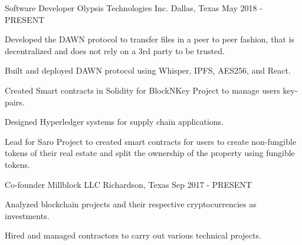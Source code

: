 

\begin{cventries}

	\cventry
	{Software Developer} %
	{Olypsis Technologies Inc.} %
	{Dallas, Texas} %
	{May 2018 - PRESENT} %
	{
		\begin{cvitems} %
			\item {Developed the DAWN protocol to transfer files in a peer to peer fashion, that is decentralized and does not rely on a 3rd party to be trusted.}
			\item {Built and deployed DAWN protocol using Whisper, IPFS, AES256, and React.}
			\item {Created Smart contracts in Solidity for BlockNKey Project to manage users key-pairs.}
			\item {Designed Hyperledger systems for supply chain applications.}
			\item {Lead for Saro Project to created smart contracts for users to create non-fungible tokens of their real estate and split the ownership of the property using fungible tokens.}
		\end{cvitems}
	}

	\cventry
	{Co-founder} %
	{Millblock LLC} %
	{Richardson, Texas} %
	{Sep 2017 - PRESENT} %
	{
		\begin{cvitems} %
			\item {Analyzed blockchain projects and their respective cryptocurrencies as investments.}
			\item {Hired and managed contractors to carry out various technical projects.}
		\end{cvitems}
	}


\end{cventries}
